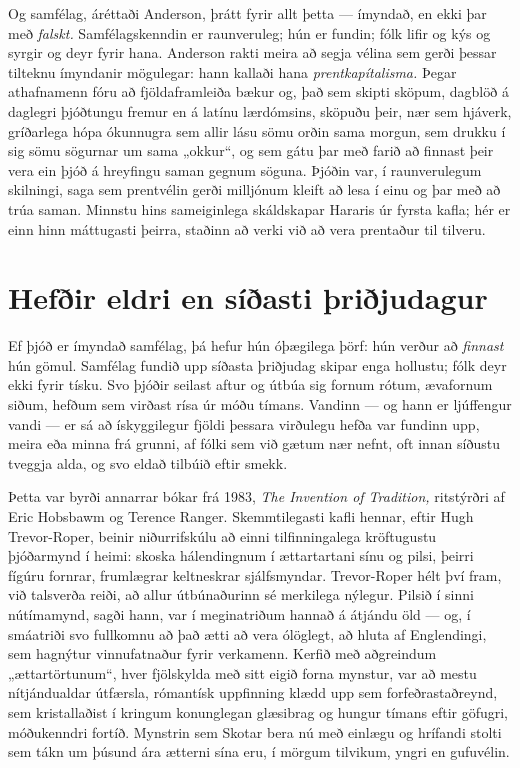 Og samfélag, áréttaði Anderson, þrátt fyrir allt þetta — ímyndað, en ekki þar með \emph{falskt.} Samfélagskenndin er raunveruleg; hún er fundin; fólk lifir og kýs og syrgir og deyr fyrir hana. Anderson rakti meira að segja vélina sem gerði þessar tilteknu ímyndanir mögulegar: hann kallaði hana \emph{prentkapítalisma.} Þegar athafnamenn fóru að fjöldaframleiða bækur og, það sem skipti sköpum, dagblöð á daglegri þjóðtungu fremur en á latínu lærdómsins, sköpuðu þeir, nær sem hjáverk, gríðarlega hópa ókunnugra sem allir lásu sömu orðin sama morgun, sem drukku í sig sömu sögurnar um sama „okkur“, og sem gátu þar með farið að finnast þeir vera ein þjóð á hreyfingu saman gegnum söguna. Þjóðin var, í raunverulegum skilningi, saga sem prentvélin gerði milljónum kleift að lesa í einu og þar með að trúa saman. Minnstu hins sameiginlega skáldskapar Hararis úr fyrsta kafla; hér er einn hinn máttugasti þeirra, staðinn að verki við að vera prentaður til tilveru.

\section*{Hefðir eldri en síðasti þriðjudagur}

Ef þjóð er ímyndað samfélag, þá hefur hún óþægilega þörf: hún verður að \emph{finnast} hún gömul. Samfélag fundið upp síðasta þriðjudag skipar enga hollustu; fólk deyr ekki fyrir tísku. Svo þjóðir seilast aftur og útbúa sig fornum rótum, ævafornum siðum, hefðum sem virðast rísa úr móðu tímans. Vandinn — og hann er ljúffengur vandi — er sá að ískyggilegur fjöldi þessara virðulegu hefða var fundinn upp, meira eða minna frá grunni, af fólki sem við gætum nær nefnt, oft innan síðustu tveggja alda, og svo eldað tilbúið eftir smekk.

Þetta var byrði annarrar bókar frá 1983, \emph{The Invention of Tradition,} ritstýrðri af Eric Hobsbawm og Terence Ranger. Skemmtilegasti kafli hennar, eftir Hugh Trevor-Roper, beinir niðurrifskúlu að einni tilfinningalega kröftugustu þjóðarmynd í heimi: skoska hálendingnum í ættartartani sínu og pilsi, þeirri fígúru fornrar, frumlægrar keltneskrar sjálfsmyndar. Trevor-Roper hélt því fram, við talsverða reiði, að allur útbúnaðurinn sé merkilega nýlegur. Pilsið í sinni nútímamynd, sagði hann, var í meginatriðum hannað á átjándu öld — og, í smáatriði svo fullkomnu að það ætti að vera ólöglegt, að hluta af Englendingi, sem hagnýtur vinnufatnaður fyrir verkamenn. Kerfið með aðgreindum „ættartörtunum“, hver fjölskylda með sitt eigið forna mynstur, var að mestu nítjándualdar útfærsla, rómantísk uppfinning klædd upp sem forfeðrastaðreynd, sem kristallaðist í kringum konunglegan glæsibrag og hungur tímans eftir göfugri, móðukenndri fortíð. Mynstrin sem Skotar bera nú með einlægu og hrífandi stolti sem tákn um þúsund ára ætterni sína eru, í mörgum tilvikum, yngri en gufuvélin.

